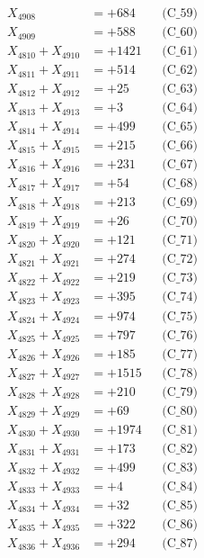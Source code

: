 \documentclass[a4paper,10pt]{article}
\begin{document}
{\begin{align}
X_{4908} &= +684 && \text{(C\_59)} \\
X_{4909} &= +588 && \text{(C\_60)} \\
\allowbreak
X_{4810} + X_{4910} &= +1421 && \text{(C\_61)} \\
X_{4811} + X_{4911} &= +514 && \text{(C\_62)} \\
X_{4812} + X_{4912} &= +25 && \text{(C\_63)} \\
X_{4813} + X_{4913} &= +3 && \text{(C\_64)} \\
X_{4814} + X_{4914} &= +499 && \text{(C\_65)} \\
\allowbreak
X_{4815} + X_{4915} &= +215 && \text{(C\_66)} \\
X_{4816} + X_{4916} &= +231 && \text{(C\_67)} \\
X_{4817} + X_{4917} &= +54 && \text{(C\_68)} \\
X_{4818} + X_{4918} &= +213 && \text{(C\_69)} \\
X_{4819} + X_{4919} &= +26 && \text{(C\_70)} \\
\allowbreak
X_{4820} + X_{4920} &= +121 && \text{(C\_71)} \\
X_{4821} + X_{4921} &= +274 && \text{(C\_72)} \\
X_{4822} + X_{4922} &= +219 && \text{(C\_73)} \\
X_{4823} + X_{4923} &= +395 && \text{(C\_74)} \\
X_{4824} + X_{4924} &= +974 && \text{(C\_75)} \\
\allowbreak
X_{4825} + X_{4925} &= +797 && \text{(C\_76)} \\
X_{4826} + X_{4926} &= +185 && \text{(C\_77)} \\
X_{4827} + X_{4927} &= +1515 && \text{(C\_78)} \\
X_{4828} + X_{4928} &= +210 && \text{(C\_79)} \\
X_{4829} + X_{4929} &= +69 && \text{(C\_80)} \\
\allowbreak
X_{4830} + X_{4930} &= +1974 && \text{(C\_81)} \\
X_{4831} + X_{4931} &= +173 && \text{(C\_82)} \\
X_{4832} + X_{4932} &= +499 && \text{(C\_83)} \\
X_{4833} + X_{4933} &= +4 && \text{(C\_84)} \\
X_{4834} + X_{4934} &= +32 && \text{(C\_85)} \\
\allowbreak
X_{4835} + X_{4935} &= +322 && \text{(C\_86)} \\
X_{4836} + X_{4936} &= +294 && \text{(C\_87)} \\

\end{align}}
\end{document}

